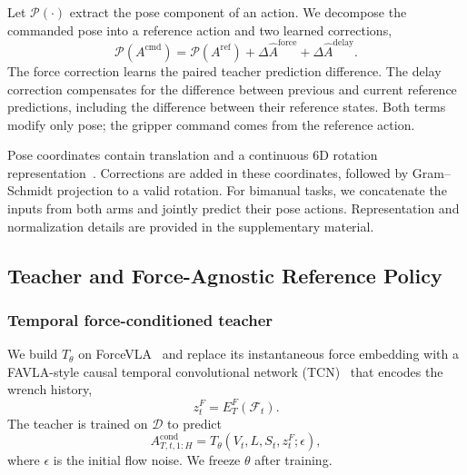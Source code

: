 Let $\mathcal P(\cdot)$ extract the pose component of an action. We decompose the commanded pose into a reference action and two learned corrections,
\begin{equation}
    \mathcal P(A^{\mathrm{cmd}})
    =\mathcal P(A^{\mathrm{ref}})
      +\Delta\hat A^{\mathrm{force}}
      +\Delta\hat A^{\mathrm{delay}}.
    \label{eq:action_comp}
\end{equation}
The force correction learns the paired teacher prediction difference. The delay correction compensates for the difference between previous and current reference predictions, including the difference between their reference states. Both terms modify only pose; the gripper command comes from the reference action.

Pose coordinates contain translation and a continuous 6D rotation representation~\cite{zhou2020continuityrotationrepresentationsneural}. Corrections are added in these coordinates, followed by Gram--Schmidt projection to a valid rotation. For bimanual tasks, we concatenate the inputs from both arms and jointly predict their pose actions. Representation and normalization details are provided in the supplementary material.

\subsection{Teacher and Force-Agnostic Reference Policy}
\label{sec:teacher_and_missing}

\subsubsection{Temporal force-conditioned teacher}

We build $T_\theta$ on ForceVLA~\cite{yu2025forcevlaenhancingvlamodels} and replace its instantaneous force embedding with a FAVLA-style causal temporal convolutional network (TCN)~\cite{li2026favlaforceadaptivefastslowvla} that encodes the wrench history,
\begin{equation}
    z_t^F=E_T^F(\mathcal F_t).
    \label{eq:teacher_tcn}
\end{equation}
The teacher is trained on $\mathcal D$ to predict
\begin{equation}
    A_{T,t,1:H}^{\mathrm{cond}}
    =T_\theta(V_t,L,S_t,z_t^F;\epsilon),
    \label{eq:conditioned_teacher}
\end{equation}
where $\epsilon$ is the initial flow noise. We freeze $\theta$ after training.

